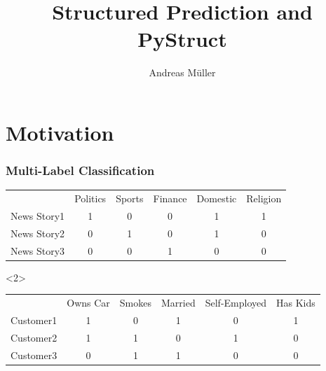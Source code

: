 \documentclass{beamer}
\title{Structured Prediction and PyStruct}
\author{Andreas M\"uller}%
\begin{document}
	\begin{frame}[plain]
		\titlepage
	\end{frame}


    \section{Motivation}
    \begin{frame}
        \frametitle{Multi-Label Classification}

        \begin{table}
            \begin{tabularx}{\linewidth}{lccccc}
                \toprule
                & \footnotesize{Politics} & \footnotesize{Sports} & \footnotesize{Finance} & \footnotesize{Domestic} & \footnotesize{Religion}\\
                \cmidrule{2-6}
                News Story1 & 1 & 0 & 0 & 1 & 1\\
                News Story2 & 0 & 1 & 0 & 1 & 0\\
                News Story3 & 0 & 0 & 1 & 0 & 0\\
                \bottomrule
            \end{tabularx}
        \end{table}

        \begin{visibleenv}<2>
        \begin{table}
            \begin{tabularx}{\linewidth}{lccccc}
                \toprule
                & \footnotesize{Owns Car} & \footnotesize{Smokes} & \footnotesize{Married} & \footnotesize{Self-Employed} & \footnotesize{Has Kids}\\
                \cmidrule{2-6}
                Customer1 & 1 & 0 & 1 & 0 & 1\\
                Customer2 & 1 & 1 & 0 & 1 & 0\\
                Customer3 & 0 & 1 & 1 & 0 & 0\\
                \bottomrule
            \end{tabularx}
        \end{table}
        \end{visibleenv}
        
    \end{frame}
\end{document}

